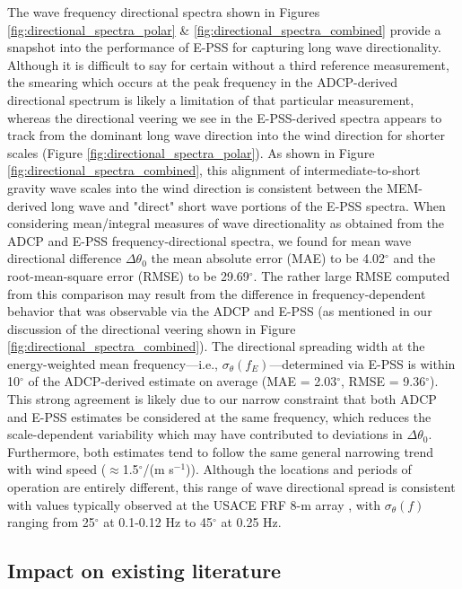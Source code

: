 \documentclass[letterpaper,journal]{IEEEtran}
\begin{document}
	The wave frequency directional spectra shown in Figures \ref{fig:directional_spectra_polar} \& \ref{fig:directional_spectra_combined} provide a snapshot into the performance of E-PSS for capturing long wave directionality. Although it is difficult to say for certain without a third reference measurement, the smearing which occurs at the peak frequency in the ADCP-derived directional spectrum is likely a limitation of that particular measurement, whereas the directional veering we see in the E-PSS-derived spectra appears to track from the dominant long wave direction into the wind direction for shorter scales (Figure \ref{fig:directional_spectra_polar}). As shown in Figure \ref{fig:directional_spectra_combined}, this alignment of intermediate-to-short gravity wave scales into the wind direction is consistent between the MEM-derived long wave and "direct" short wave portions of the E-PSS spectra. When considering mean/integral measures of wave directionality as obtained from the ADCP and E-PSS frequency-directional spectra, we found for mean wave directional difference $\Delta\theta_0$ the mean absolute error (MAE) to be 4.02$^{\circ}$ and the root-mean-square error (RMSE) to be 29.69$^{\circ}$. The rather large RMSE computed from this comparison may result from the difference in frequency-dependent behavior that was observable via the ADCP and E-PSS (as mentioned in our discussion of the directional veering shown in Figure \ref{fig:directional_spectra_combined}). The directional spreading width at the energy-weighted mean frequency---i.e., $\sigma_\theta(f_E)$---determined via E-PSS is within 10$^{\circ}$ of the ADCP-derived estimate on average (MAE = 2.03$^{\circ}$, RMSE = 9.36$^{\circ}$). This strong agreement is likely due to our narrow constraint that both ADCP and E-PSS estimates be considered at the same frequency, which reduces the scale-dependent variability which may have contributed to deviations in $\Delta\theta_0$. Furthermore, both estimates tend to follow the same general narrowing trend with wind speed ($\approx$1.5$^{\circ}$/(m s$^{-1}$)). Although the locations and periods of operation are entirely different, this range of wave directional spread is consistent with values typically observed at the USACE FRF 8-m array \cite{collins_performance_2024}, with $\sigma_\theta(f)$ ranging from 25$^{\circ}$ at 0.1-0.12 Hz to 45$^{\circ}$ at 0.25 Hz.
	
	
	\subsection{Impact on existing literature}
	
\end{document}
